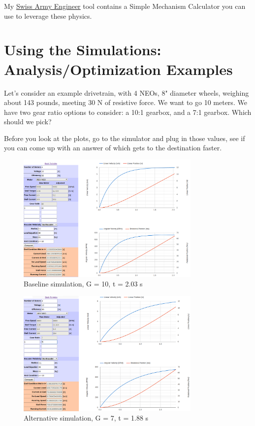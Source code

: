 \documentclass[10pt,letterpaper]{book}
\begin{document}
	My \href{http://thaddeus-maximus.github.io/swissarmyengineer/}{\color{red}\underline{Swiss Army Engineer}} tool contains a Simple Mechanism Calculator you can use to leverage these physics.

	
\section{Using the Simulations: Analysis/Optimization Examples}

Let's consider an example drivetrain, with 4 NEOs, 8" diameter wheels, weighing about 143 pounds, meeting 30 N of resistive force. We want to go 10 meters. We have two gear ratio options to consider: a 10:1 gearbox, and a 7:1 gearbox. Which should we pick?

Before you look at the plots, go to the simulator and plug in those values, see if you can come up with an answer of which gets to the destination faster.

\clearpage
	
	\begin{figure}[H] \centering
	\includegraphics[width=0.8\textwidth]{imgs/thsae_1.png}
	\caption{Baseline simulation, G = 10, t = 2.03 s}
	\end{figure}
	
	\begin{figure}[H] \centering
	\includegraphics[width=0.8\textwidth]{imgs/thsae_2.png}
	\caption{Alternative simulation, G = 7, t = 1.88 s}
	\end{figure}
	
\end{document}
